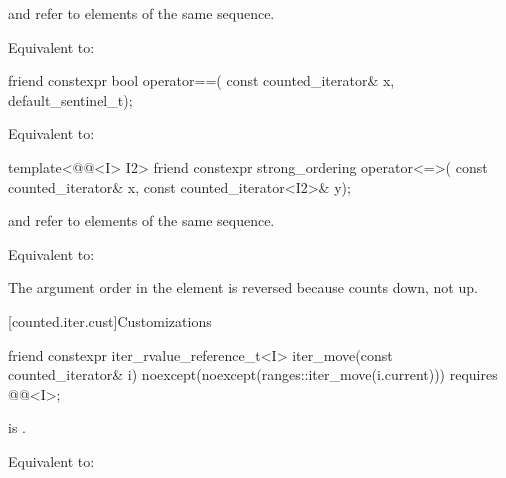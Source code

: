 \begin{itemdescr}
\pnum
\expects
{} and  refer to
elements of the same sequence.

\pnum
\effects
Equivalent to: 
\end{itemdescr}

%
\begin{itemdecl}
friend constexpr bool operator==(
  const counted_iterator& x, default_sentinel_t);
\end{itemdecl}

\begin{itemdescr}
\pnum
\effects
Equivalent to: 
\end{itemdescr}

%
\begin{itemdecl}
template<@@<I> I2>
  friend constexpr strong_ordering operator<=>(
    const counted_iterator& x, const counted_iterator<I2>& y);
\end{itemdecl}

\begin{itemdescr}
\pnum
\expects
{} and  refer to
elements of the same sequence.

\pnum
\effects
Equivalent to: 

\pnum
\begin{note}
The argument order in the \effects element is reversed
because  counts down, not up.
\end{note}
\end{itemdescr}

[counted.iter.cust]{Customizations}

%
\begin{itemdecl}
friend constexpr iter_rvalue_reference_t<I>
  iter_move(const counted_iterator& i)
    noexcept(noexcept(ranges::iter_move(i.current)))
    requires @@<I>;
\end{itemdecl}

\begin{itemdescr}
\pnum
\expects
{} is .

\pnum
\effects
Equivalent to: 
\end{itemdescr}

